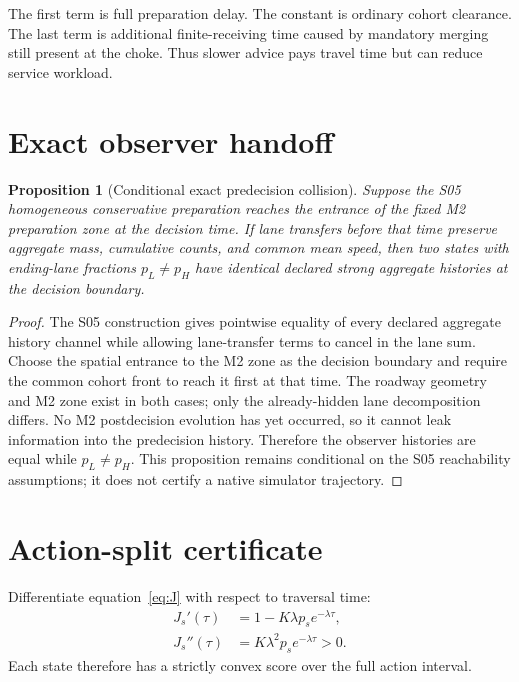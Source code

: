 \documentclass[11pt]{article}
\newtheorem{proposition}{Proposition}
\begin{document}
The first term is full preparation delay. The constant is ordinary cohort
clearance. The last term is additional finite-receiving time caused by mandatory
merging still present at the choke. Thus slower advice pays travel time but can
reduce service workload.

\section{Exact observer handoff}

\begin{proposition}[Conditional exact predecision collision]
Suppose the S05 homogeneous conservative preparation reaches the entrance of the
fixed M2 preparation zone at the decision time. If lane transfers before that
time preserve aggregate mass, cumulative counts, and common mean speed, then two
states with ending-lane fractions \(p_L\ne p_H\) have identical declared strong
aggregate histories at the decision boundary.
\end{proposition}

\begin{proof}
The S05 construction gives pointwise equality of every declared aggregate
history channel while allowing lane-transfer terms to cancel in the lane sum.
Choose the spatial entrance to the M2 zone as the decision boundary and require
the common cohort front to reach it first at that time. The roadway geometry and
M2 zone exist in both cases; only the already-hidden lane decomposition differs.
No M2 postdecision evolution has yet occurred, so it cannot leak information
into the predecision history. Therefore the observer histories are equal while
\(p_L\ne p_H\). This proposition remains conditional on the S05 reachability
assumptions; it does not certify a native simulator trajectory.
\end{proof}

\section{Action-split certificate}

Differentiate equation~\eqref{eq:J} with respect to traversal time:
\begin{align}
 J_s'(\tau)&=1-K\lambda p_s e^{-\lambda\tau},
 \label{eq:first}\\
 J_s''(\tau)&=K\lambda^2p_s e^{-\lambda\tau}>0.
 \label{eq:second}
\end{align}
Each state therefore has a strictly convex score over the full action interval.
\end{document}
